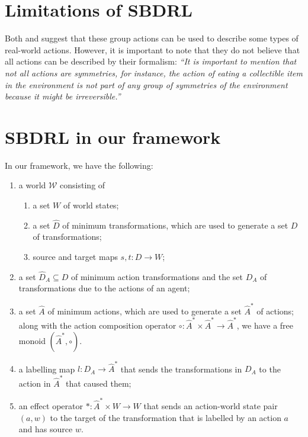 \section{Limitations of SBDRL}

Both \autocite{Higgins2018} and \autocite{caselles2019symmetry} suggest that these group actions can be used to describe some types of real-world actions.
However, it is important to note that they do not believe that all actions can be described by their formalism: \textit{``It is important to mention that not all actions are symmetries, for instance, the action of eating a collectible item in the environment is not part of any group of symmetries of the environment because it might be irreversible.''} \autocite{caselles2019symmetry}

\section{SBDRL in our framework}

In our framework, we have the following:
\begin{enumerate}
    \item a world $\mathscr{W}$ consisting of
    \begin{enumerate}
        \item a set $W$ of world states;
        \item a set $\hat{D}$ of minimum transformations, which are used to generate a set $D$ of transformations;
        \item source and target maps $s, t: D \to W$;
    \end{enumerate}

    \item a set $\hat{D}_{A} \subseteq D$ of minimum action transformations and the set $D_{A}$ of transformations due to the actions of an agent;
    \item a set $\hat{A}$ of minimum actions, which are used to generate a set $\hat{A}^{*}$ of actions; along with the action composition operator $\circ: \hat{A}^{*} \times \hat{A}^{*} \to \hat{A}^{*}$, we have a free monoid $(\hat{A}^{*}, \circ)$.
    \item a labelling map $l: D_{A} \to \hat{A}^{*}$ that sends the transformations in $D_{A}$ to the action in $\hat{A}^{*}$ that caused them;
    \item an effect operator $\ast : \hat{A}^{*} \times W \to W$ that sends an action-world state pair $(a, w)$ to the target of the transformation that is labelled by an action $a$ and has source $w$.
\end{enumerate}


